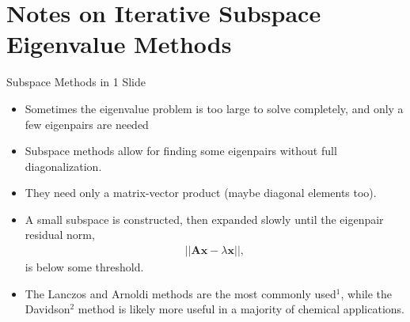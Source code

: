 \documentclass[10pt]{beamer}
\begin{document}
{{{{{{{{{\section{Notes on Iterative Subspace Eigenvalue Methods}
{%
\begin{frame}{Subspace Methods in 1 Slide}
	\begin{itemize}
		\item{Sometimes the eigenvalue problem is too large to solve completely, and only a few eigenpairs are needed}
		\item{Subspace methods allow for finding some eigenpairs without full diagonalization}.
		\item{They need only a matrix-vector product (maybe diagonal elements too).}
		\item{A small subspace is constructed, then expanded slowly until the eigenpair residual norm,
			\begin{eqnarray}
				||\mathbf{Ax} - \lambda \mathbf{x}||,
			\end{eqnarray}
		is below some threshold.
		}
		\item{The \alert{Lanczos} and \alert{Arnoldi} methods are the most commonly used$^1$, while the \alert{Davidson}$^2$ method is likely more useful in a majority of chemical applications. }
	\end{itemize}
\end{frame}

{%
}}}}}}}}}}}
\end{document}
